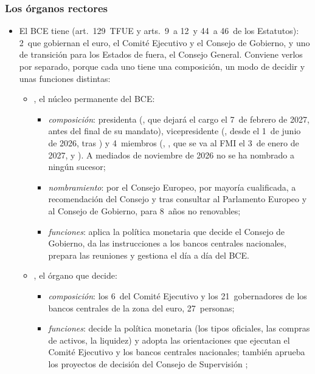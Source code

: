 \documentclass[11pt]{article}
\begin{document}
\subsubsection{Los órganos rectores}\label{sec:organos}

\begin{itemize}
\item El BCE tiene  (art.~129~TFUE y arts.~9~a 12~y 44~a 46~de los Estatutos)\nocite{UE2016Protocolo4}: 2~que gobiernan el euro, el Comité Ejecutivo y el Consejo de Gobierno, y uno de transición para los Estados de fuera, el Consejo General. Conviene verlos por separado, porque cada uno tiene una composición, un modo de decidir y unas funciones distintas:
  \begin{itemize}
  \item {}, el núcleo permanente del BCE:
    \begin{itemize}
    \item \emph{composición}: presidenta (, que dejará el cargo el 7~de febrero de 2027, antes del final de su mandato)\nocite{BCE2026Lagarde}, vicepresidente (, desde el 1~de junio de 2026, tras )\nocite{HNB2026Vujcic} y 4~miembros (, , que se va al FMI el 3~de enero de 2027,  y )\nocite{BCE2026Mandatos,BCE2026Schnabel}. A mediados de noviembre de 2026 no se ha nombrado a ningún sucesor;
    \item \emph{nombramiento}: por el Consejo Europeo, por mayoría cualificada, a recomendación del Consejo y tras consultar al Parlamento Europeo y al Consejo de Gobierno, para 8~años no renovables;
    \item \emph{funciones}: aplica la política monetaria que decide el Consejo de Gobierno, da las instrucciones a los bancos centrales nacionales, prepara las reuniones y gestiona el día a día del BCE.
    \end{itemize}
  \item {}, el órgano que decide:
    \begin{itemize}
    \item \emph{composición}: los 6~del Comité Ejecutivo y los 21~gobernadores de los bancos centrales de la zona del euro, 27~personas;
    \item \emph{funciones}: decide la política monetaria (los tipos oficiales, las compras de activos, la liquidez) y adopta las orientaciones que ejecutan el Comité Ejecutivo y los bancos centrales nacionales; también aprueba los proyectos de decisión del Consejo de Supervisión ;

\end{itemize}
\end{itemize}
\end{itemize}
\end{document}
